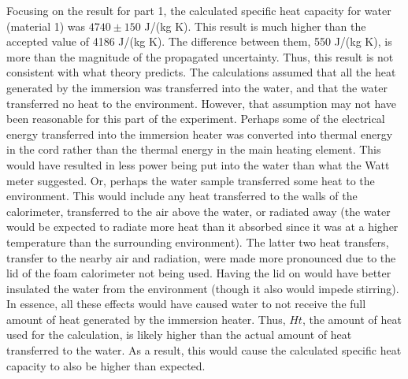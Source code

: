 \documentclass[12pt]{iopart} %
\begin{document}
Focusing on the result for part 1, the calculated specific heat capacity for water (material 1) was $4740 \pm 150$ J/(kg K).
This result is much higher than the accepted value of 4186 J/(kg K).
The difference between them, 550 J/(kg K), is more than the magnitude of the propagated uncertainty.
Thus, this result is not consistent with what theory predicts.
The calculations assumed that all the heat generated by the immersion was transferred into the water, and that the water transferred no heat to the environment.
However, that assumption may not have been reasonable for this part of the experiment.
Perhaps some of the electrical energy transferred into the immersion heater was converted into thermal energy in the cord rather than the thermal energy in the main heating element.
This would have resulted in less power being put into the water than what the Watt meter suggested.
Or, perhaps the water sample transferred some heat to the environment.
This would include any heat transferred to the walls of the calorimeter, transferred to the air above the water, or radiated away (the water would be expected to radiate more heat than it absorbed since it was at a higher temperature than the surrounding environment).
The latter two heat transfers, transfer to the nearby air and radiation, were made more pronounced due to the lid of the foam calorimeter not being used.
Having the lid on would have better insulated the water from the environment (though it also would impede stirring).
In essence, all these effects would have caused water to not receive the full amount of heat generated by the immersion heater.
Thus, $Ht$, the amount of heat used for the calculation, is likely higher than the actual amount of heat transferred to the water.
As a result, this would cause the calculated specific heat capacity to also be higher than expected.
\end{document}
